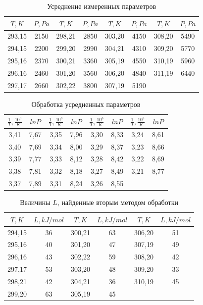 \documentclass[14pt, a4paper]{report}
\begin{document}
\begin{table}[!ht]
\centering
\begin{tabular}{| c | c | c | c | c | c | c | c |}
\hline
$T, K$ & $P, Pa$ & $T, K$ & $P, Pa$ &$T, K$ & $P, Pa$ & $T, K$ & $P, Pa$ \\
\hline
293,15	& 2150	& 298,21	& 2850	& 303,20	& 4150	& 308,20	& 5490 \\
294,15	& 2200	& 299,20	& 2990	& 304,21	& 4310	& 309,20	& 5770 \\
295,16	& 2370	& 300,21	& 3360	& 305,19	& 4550	& 310,19	& 5960 \\
296,16	& 2460	& 301,20	& 3560	& 306,20	& 4840	& 311,19	& 6440 \\
297,17	& 2660	& 302,22	& 3800	& 307,19	& 5190	& 	& \\
\hline
\end{tabular}
\label{table2}
\caption{Усреднение измеренных параметров}
\end{table}

\begin{table}[!ht]
\centering
\begin{tabular}{| c | c | c | c | c | c | c | c |}
\hline
$\frac{1}{T}, \frac{10^3}{K}$ & $lnP$ & $\frac{1}{T}, \frac{10^3}{K}$ & $lnP$ & $\frac{1}{T}, \frac{10^3}{K}$ & $lnP$ & $\frac{1}{T}, \frac{10^3}{K}$ & $lnP$ \\
\hline
3,41	& 7,67	& 3,35	& 7,96	& 3,30	& 8,33	& 3,24	& 8,61 \\
3,40	& 7,69	& 3,34	& 8,00	& 3,29	& 8,37	& 3,23	& 8,66 \\
3,39	& 7,77	& 3,33	& 8,12	& 3,28	& 8,42	& 3,22	& 8,69 \\
3,38	& 7,81	& 3,32	& 8,18	& 3,27	& 8,49	& 3,21	& 8,77 \\
3,37	& 7,89	& 3,31	& 8,24	& 3,26	& 8,55	& 	& \\
\hline
\end{tabular}
\label{table3}
\caption{Обработка усредненных параметров}
\end{table}

\begin{table}[!ht]
\centering
\begin{tabular}{| c | c | c | c | c | c |}
\hline
$T, K$ & $L, kJ/mol$ & $T, K$ & $L, kJ/mol$ & $T, K$ & $L, kJ/mol$ \\
\hline
294,15	& 36	& 300,21	& 63	& 306,20	& 51 \\
295,16	& 40	& 301,20	& 47	& 307,19	& 49 \\
296,16	& 43	& 302,22	& 59	& 308,20	& 42 \\
297,17	& 53	& 303,20	& 48	& 309,20	& 33 \\
298,21	& 42	& 304,21	& 36	& 310,19	& 45 \\
299,20	& 63	& 305,19	& 45	& 	& \\
\hline
\end{tabular}
\label{table4}
\caption{Величины $L$, найденные вторым методом обработки}
\end{table}
\end{document}
